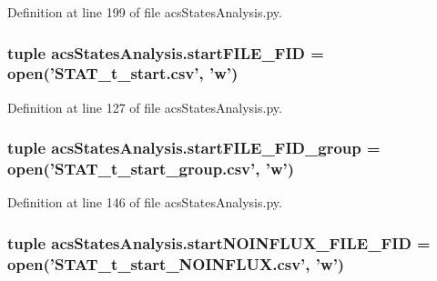 Definition at line 199 of file acs\-States\-Analysis.\-py.

\hypertarget{a00104_a0239a9dcc4900463a0c19557bec23521}{
\subsubsection[{start\-F\-I\-L\-E\-\_\-\-F\-I\-D}]{\setlength{\rightskip}{0pt plus 5cm}tuple acs\-States\-Analysis.\-start\-F\-I\-L\-E\-\_\-\-F\-I\-D = open('S\-T\-A\-T\-\_\-t\-\_\-start.\-csv', 'w')}}\label{a00104_a0239a9dcc4900463a0c19557bec23521}


Definition at line 127 of file acs\-States\-Analysis.\-py.

\hypertarget{a00104_addede16e21598cc53c446efa66bd20d9}{
\subsubsection[{start\-F\-I\-L\-E\-\_\-\-F\-I\-D\-\_\-group}]{\setlength{\rightskip}{0pt plus 5cm}tuple acs\-States\-Analysis.\-start\-F\-I\-L\-E\-\_\-\-F\-I\-D\-\_\-group = open('S\-T\-A\-T\-\_\-t\-\_\-start\-\_\-group.\-csv', 'w')}}\label{a00104_addede16e21598cc53c446efa66bd20d9}


Definition at line 146 of file acs\-States\-Analysis.\-py.

\hypertarget{a00104_a44f4f158af9771fbabbbacc4f4484d32}{
\subsubsection[{start\-N\-O\-I\-N\-F\-L\-U\-X\-\_\-\-F\-I\-L\-E\-\_\-\-F\-I\-D}]{\setlength{\rightskip}{0pt plus 5cm}tuple acs\-States\-Analysis.\-start\-N\-O\-I\-N\-F\-L\-U\-X\-\_\-\-F\-I\-L\-E\-\_\-\-F\-I\-D = open('S\-T\-A\-T\-\_\-t\-\_\-start\-\_\-\-N\-O\-I\-N\-F\-L\-U\-X.\-csv', 'w')}}\label{a00104_a44f4f158af9771fbabbbacc4f4484d32}


